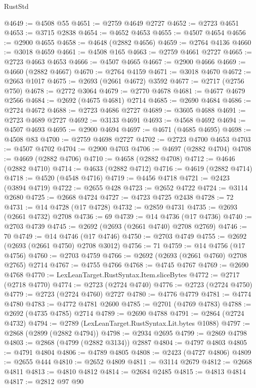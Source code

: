 \begin{lexlean}{RustStd}
\begin{coremodule}
@4649 := @4508 @55
@4651 := @2759 @4649 @2727
@4652 := @2723 @4651
@4653 := @3715 @2838
@4654 := @4652 @4653
@4655 := @4507 @4654
@4656 := @2900 @4655
@4658 := @4648 (@2882 @4656)
@4659 := @2764 @4136
@4660 := @3018 @4659
@4661 := @4508 @165
@4663 := @2759 @4661 @2727
@4665 := @2723 @4663 @4653
@4666 := @4507 @4665
@4667 := @2900 @4666
@4669 := @4660 (@2882 @4667)
@4670 := @2764 @4159
@4671 := @3018 @4670
@4672 := @2663 @1017
@4675 := @2693 (@2661 @4672) @3592
@4677 := @2717 (@2756 @750)
@4678 := @2772 @3064
@4679 := @2770 @4678
@4681 := @4677 @4679 @2566
@4684 := @2692 (@4675 @4681) @2714
@4685 := @2690 @4684
@4686 := @2724 @4672
@4688 := @2723 @4686 @2727
@4689 := @3605 @4688
@4691 := @2723 @4689 @2727
@4692 := @3133 @4691
@4693 := @4568 @4692
@4694 := @4507 @4693
@4695 := @2900 @4694
@4697 := @4671 (@4685 @4695)
@4698 := @4508 @83
@4700 := @2759 @4698 @2727
@4702 := @2723 @4700 @4653
@4703 := @4507 @4702
@4704 := @2900 @4703
@4706 := @4697 (@2882 @4704)
@4708 := @4669 (@2882 @4706)
@4710 := @4658 (@2882 @4708)
@4712 := @4646 (@2882 @4710)
@4714 := @4633 (@2882 @4712)
@4716 := @4619 (@2882 @4714)
@4718 := @4520 (@4548 @4716)
@4719 := @4456 @4718
@4721 := @2423 (@3894 @4719)
@4722 := @2655 @428
@4723 := @2652 @4722
@4724 := @3114 @2680
@4725 := @2668 @4724
@4727 := @4723 @4725 @2438
@4728 := 72
@4731 := @14 @4728 (@17 @4728)
@4732 := @2859 @4731
@4735 := @2693 (@2661 @4732) @2708
@4736 := 69
@4739 := @14 @4736 (@17 @4736)
@4740 := @2703 @4739
@4745 := @2692 (@2693 (@2661 @4740) @2708 @2769)
@4746 := 70
@4749 := @14 @4746 (@17 @4746)
@4750 := @2703 @4749
@4755 := @2692 (@2693 (@2661 @4750) @2708 @3012)
@4756 := 71
@4759 := @14 @4756 (@17 @4756)
@4760 := @2703 @4759
@4766 := @2692 (@2693 (@2661 @4760) @2708 @2765) @2714
@4767 := @4755 @4766
@4768 := @4745 @4767
@4769 := @2690 @4768
@4770 := LexLeanTarget.RustSyntax.Item.sliceBytes
@4772 := @2717 (@2718 @4770)
@4774 := @2723 (@2724 @4740)
@4776 := @2723 (@2724 @4750)
@4779 := @2723 (@2724 @4760) @2727
@4780 := @4776 @4779
@4781 := @4774 @4780
@4783 := @4772 @4781 @2600
@4785 := @2701 (@4769 @4783)
@4788 := @2692 (@4735 @4785) @2714
@4789 := @2690 @4788
@4791 := @2864 (@2724 @4732)
@4794 := @2789 (LexLeanTarget.RustSyntax.Lit.bytes @1088)
@4797 := @2868 (@2899 (@2882 @4794))
@4798 := @2934 @2695
@4799 := @2869 @4798
@4803 := @2868 (@4799 (@2882 @3134)) @2887
@4804 := @4797 @4803
@4805 := @4791 @4804
@4806 := @4789 @4805
@4808 := @2423 (@4727 @4806)
@4809 := @2655 @444
@4810 := @2652 @4809
@4811 := @3114 @2679
@4812 := @2668 @4811
@4813 := @4810 @4812
@4814 := @2684 @2485
@4815 := @4813 @4814
@4817 := @2812 @97 @90

\end{coremodule}
\end{lexlean}
